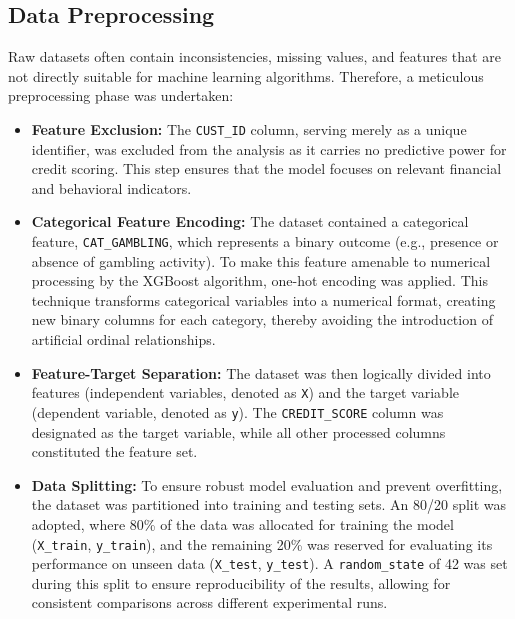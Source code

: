 \documentclass{article}
\begin{document}
\subsection{Data Preprocessing}

Raw datasets often contain inconsistencies, missing values, and features that are not directly suitable for machine learning algorithms. Therefore, a meticulous preprocessing phase was undertaken:

\begin{itemize}
    \item \textbf{Feature Exclusion:} The \texttt{CUST\_ID} column, serving merely as a unique identifier, was excluded from the analysis as it carries no predictive power for credit scoring. This step ensures that the model focuses on relevant financial and behavioral indicators.

    \item \textbf{Categorical Feature Encoding:} The dataset contained a categorical feature, \texttt{CAT\_GAMBLING}, which represents a binary outcome (e.g., presence or absence of gambling activity). To make this feature amenable to numerical processing by the XGBoost algorithm, one-hot encoding was applied. This technique transforms categorical variables into a numerical format, creating new binary columns for each category, thereby avoiding the introduction of artificial ordinal relationships.

    \item \textbf{Feature-Target Separation:} The dataset was then logically divided into features (independent variables, denoted as \texttt{X}) and the target variable (dependent variable, denoted as \texttt{y}). The \texttt{CREDIT\_SCORE} column was designated as the target variable, while all other processed columns constituted the feature set.

    \item \textbf{Data Splitting:} To ensure robust model evaluation and prevent overfitting, the dataset was partitioned into training and testing sets. An 80/20 split was adopted, where 80\% of the data was allocated for training the model (\texttt{X\_train}, \texttt{y\_train}), and the remaining 20\% was reserved for evaluating its performance on unseen data (\texttt{X\_test}, \texttt{y\_test}). A \texttt{random\_state} of 42 was set during this split to ensure reproducibility of the results, allowing for consistent comparisons across different experimental runs.
\end{itemize}
\end{document}

